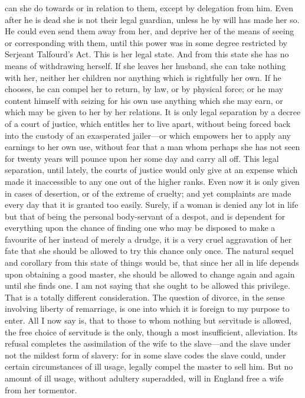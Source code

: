 \documentclass[12pt]{report}
\begin{document}
can she do towards or in relation to them, except by delegation from him. Even after he is dead she is not their legal guardian, unless he by will has made her so. He could even send them away from her, and deprive her of the means of seeing or corresponding with them, until this power was in some degree restricted by Serjeant Talfourd's Act. This is her legal state. And from this state she has no means of withdrawing herself. If she leaves her husband, she can take nothing with her, neither her children nor anything which is rightfully her own. If he chooses, he can compel her to return, by law, or by physical force; or he may content himself with seizing for his own use anything which she may earn, or which may be given to her by her relations. It is only legal separation by a decree of a court of justice, which entitles her to live apart, without being forced back into the custody of an exasperated jailer—or which empowers her to apply any earnings to her own use, without fear that a man whom perhaps she has not seen for twenty years will pounce upon her some day and carry all off. This legal separation, until lately, the courts of justice would only give at an expense which made it inaccessible to any one out of the higher ranks. Even now it is only given in cases of desertion, or of the extreme of cruelty; and yet complaints are made every day that it is granted too easily. Surely, if a woman is denied any lot in life but that of being the personal body-servant of a despot, and is dependent for everything upon the chance of finding one who may be disposed to make a favourite of her instead of merely a drudge, it is a very cruel aggravation of her fate that she should be allowed to try this chance only once. The natural sequel and corollary from this state of things would be, that since her all in life depends upon obtaining a good master, she should be allowed to change again and again until she finds one. I am not saying that she ought to be allowed this privilege. That is a totally different consideration. The question of divorce, in the sense involving liberty of remarriage, is one into which it is foreign to my purpose to enter. All I now say is, that to those to whom nothing but servitude is allowed, the free choice of servitude is the only, though a most insufficient, alleviation. Its refusal completes the assimilation of the wife to the slave—and the slave under not the mildest form of slavery: for in some slave codes the slave could, under certain circumstances of ill usage, legally compel the master to sell him. But no amount of ill usage, without adultery superadded, will in England free a wife from her tormentor.
\end{document}
